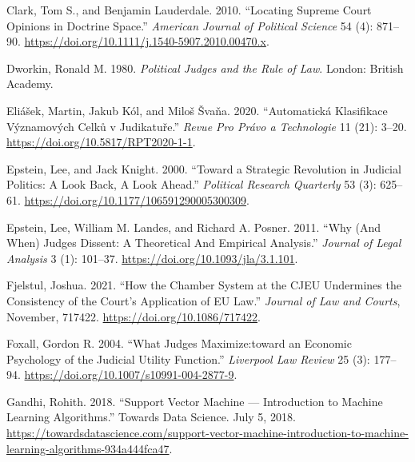 \documentclass[
  11pt,
]{article}
\newlength{\cslhangindent}
\newenvironment{CSLReferences}[2] %
 {%
  \setlength{\parindent}{0pt}
  \ifodd #1 \everypar{\setlength{\hangindent}{\cslhangindent}}\ignorespaces\fi
  \ifnum #2 > 0
  \setlength{\parskip}{#2\baselineskip}
  \fi
 }%
 {}
\begin{document}
\begin{CSLReferences}{1}{0}
\leavevmode{}%
Clark, Tom S., and Benjamin Lauderdale. 2010. {``Locating {Supreme Court
Opinions} in {Doctrine Space}.''} \emph{American Journal of Political
Science} 54 (4): 871--90.
\url{https://doi.org/10.1111/j.1540-5907.2010.00470.x}.

\leavevmode{}%
Dworkin, Ronald M. 1980. \emph{Political Judges and the Rule of Law}.
{London}: {British Academy}.

\leavevmode{}%
Eliášek, Martin, Jakub Kól, and Miloš Švaňa. 2020. {``Automatická
Klasifikace Významových Celků v Judikatuře.''} \emph{Revue Pro Právo a
Technologie} 11 (21): 3--20. \url{https://doi.org/10.5817/RPT2020-1-1}.

\leavevmode{}%
Epstein, Lee, and Jack Knight. 2000. {``Toward a {Strategic Revolution}
in {Judicial Politics}: {A Look Back}, {A Look Ahead}.''}
\emph{Political Research Quarterly} 53 (3): 625--61.
\url{https://doi.org/10.1177/106591290005300309}.

\leavevmode{}%
Epstein, Lee, William M. Landes, and Richard A. Posner. 2011. {``Why
({And When}) {Judges Dissent}: {A Theoretical And Empirical
Analysis}.''} \emph{Journal of Legal Analysis} 3 (1): 101--37.
\url{https://doi.org/10.1093/jla/3.1.101}.

\leavevmode{}%
Fjelstul, Joshua. 2021. {``How the {Chamber System} at the {CJEU
Undermines} the {Consistency} of the {Court}'s {Application} of {EU
Law}.''} \emph{Journal of Law and Courts}, November, 717422.
\url{https://doi.org/10.1086/717422}.

\leavevmode{}%
Foxall, Gordon R. 2004. {``What Judges Maximize:toward an Economic
Psychology of the Judicial Utility Function.''} \emph{Liverpool Law
Review} 25 (3): 177--94.
\url{https://doi.org/10.1007/s10991-004-2877-9}.

\leavevmode{}%
Gandhi, Rohith. 2018. {``Support {Vector Machine} --- {Introduction} to
{Machine Learning Algorithms}.''} {Towards Data Science}. July 5, 2018.
\url{https://towardsdatascience.com/support-vector-machine-introduction-to-machine-learning-algorithms-934a444fca47}.


\end{CSLReferences}
\end{document}
